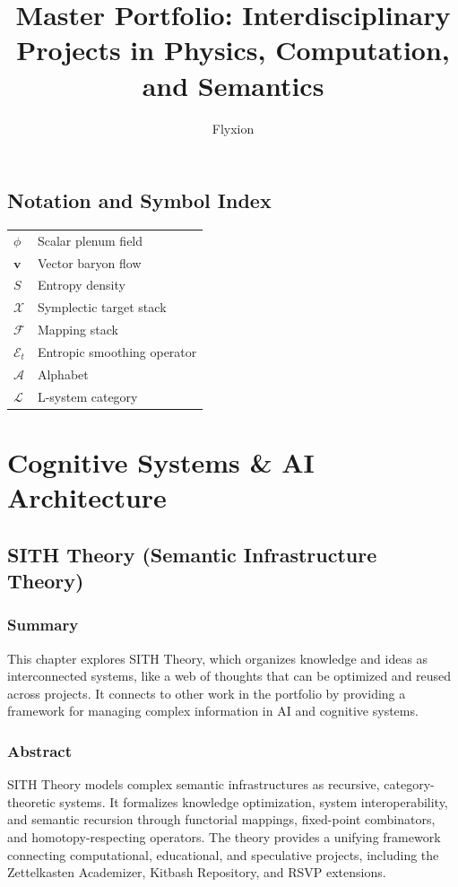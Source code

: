 \documentclass[11pt,oneside]{memoir}
\theoremstyle{plain}
\newcommand{\F}{\mathcal{F}}
\newcommand{\X}{\mathcal{X}}
\newcommand{\E}{\mathcal{E}}
\newcommand{\A}{\mathcal{A}}
\newcommand{\L}{\mathcal{L}}
\begin{document}
\frontmatter
\title{Master Portfolio: Interdisciplinary Projects in Physics, Computation, and Semantics}
\author{Flyxion}
\maketitle
\tableofcontents
\listoffigures

\chapter*{Notation and Symbol Index}
\begin{tabular}{ll}
$\phi$ & Scalar plenum field \\
$\mathbf{v}$ & Vector baryon flow \\
$S$ & Entropy density \\
$\X$ & Symplectic target stack \\
$\F$ & Mapping stack \\
$\E_t$ & Entropic smoothing operator \\
$\A$ & Alphabet \\
$\L$ & L-system category \\
\end{tabular}

\mainmatter

\part{Cognitive Systems \& AI Architecture}

\chapter{SITH Theory (Semantic Infrastructure Theory)}
\label{sec:sith}

\section{Summary}
This chapter explores SITH Theory, which organizes knowledge and ideas as interconnected systems, like a web of thoughts that can be optimized and reused across projects. It connects to other work in the portfolio by providing a framework for managing complex information in AI and cognitive systems.

\section{Abstract}
SITH Theory models complex semantic infrastructures as recursive, category-theoretic systems. It formalizes knowledge optimization, system interoperability, and semantic recursion through functorial mappings, fixed-point combinators, and homotopy-respecting operators. The theory provides a unifying framework connecting computational, educational, and speculative projects, including the Zettelkasten Academizer, Kitbash Repository, and RSVP extensions.
\end{document}
